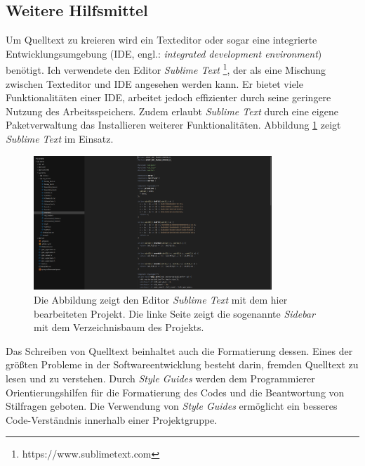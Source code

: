 \documentclass[crop=false]{standalone}
\begin{document}
  \subsection{Weitere Hilfsmittel} %
  \label{sub:weitere_hilfsmittel}
    Um Quelltext zu kreieren wird ein Texteditor oder sogar eine integrierte Entwicklungsumgebung (IDE, engl.: \textit{integrated development environment}) benötigt.
    Ich verwendete den Editor \textit{Sublime Text}%
    \footnote{https://www.sublimetext.com}, der als eine Mischung zwischen Texteditor und IDE angesehen werden kann.
    Er bietet viele Funktionalitäten einer IDE, arbeitet jedoch effizienter durch seine geringere Nutzung des Arbeitsspeichers.
    Zudem erlaubt \textit{Sublime Text} durch eine eigene Paketverwaltung das Installieren weiterer Funktionalitäten.
    Abbildung \ref{fig:sublime-text-example} zeigt \textit{Sublime Text} im Einsatz.
    \begin{figure}
      \center
      \includegraphics[width=0.8\textwidth]{images/sublime_text_example.png}
      \caption{%
        Die Abbildung zeigt den Editor \textit{Sublime Text} mit dem hier bearbeiteten Projekt.
        Die linke Seite zeigt die sogenannte \textit{Sidebar} mit dem Verzeichnisbaum des Projekts.
      }
      \label{fig:sublime-text-example}
    \end{figure}

    Das Schreiben von Quelltext beinhaltet auch die Formatierung dessen.
    Eines der größten Probleme in der Softwareentwicklung besteht darin, fremden Quelltext zu lesen und zu verstehen.
    Durch \textit{Style Guides} werden dem Programmierer Orientierungshilfen für die Formatierung des Codes und die Beantwortung von Stilfragen geboten.
    Die Verwendung von \textit{Style Guides} ermöglicht ein besseres Code-Verständnis innerhalb einer Projektgruppe.

\end{document}
